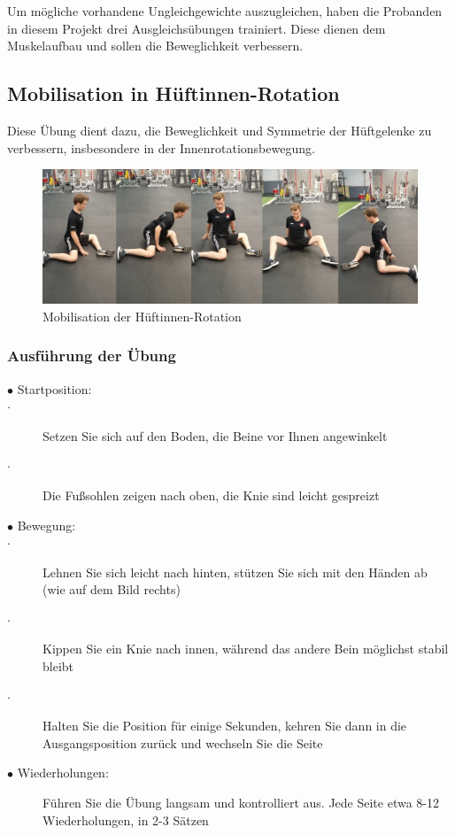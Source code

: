 Um mögliche vorhandene Ungleichgewichte auszugleichen, haben die Probanden in diesem Projekt drei Ausgleichsübungen trainiert.
Diese dienen dem Muskelaufbau und sollen die Beweglichkeit verbessern.

\subsection{Mobilisation in Hüftinnen-Rotation}
Diese Übung dient dazu, die Beweglichkeit und Symmetrie der Hüftgelenke zu verbessern, insbesondere in der Innenrotationsbewegung.
\begin{figure}[h!]
    \centering
    \includegraphics[width=0.8\linewidth]{img/Hueftmobility-betterbodygroup.jpg}
    \caption{Mobilisation der Hüftinnen-Rotation \cite{betterbodygroup}}
    \label{Mobilisation-der-Hueftinnen-Rotation}
\end{figure}

\subsubsection{Ausführung der Übung}

\begin{description}
    \item[$\bullet$ Startposition:]
        \item[$\cdot$ ] Setzen Sie sich auf den Boden, die Beine vor Ihnen angewinkelt
        \item[$\cdot$] Die Fußsohlen zeigen nach oben, die Knie sind leicht gespreizt
    \item[$\bullet$ Bewegung:]
        \item[$\cdot$] Lehnen Sie sich leicht nach hinten, stützen Sie sich mit den Händen ab (wie auf dem Bild rechts)
        \item[$\cdot$]Kippen Sie ein Knie nach innen, während das andere Bein möglichst stabil bleibt
        \item[$\cdot$] Halten Sie die Position für einige Sekunden, kehren Sie dann in die Ausgangsposition zurück und wechseln Sie die Seite
    \item[$\bullet$ Wiederholungen:]Führen Sie die Übung langsam und kontrolliert aus. Jede Seite etwa 8-12 Wiederholungen, in 2-3 Sätzen
\end{description}

